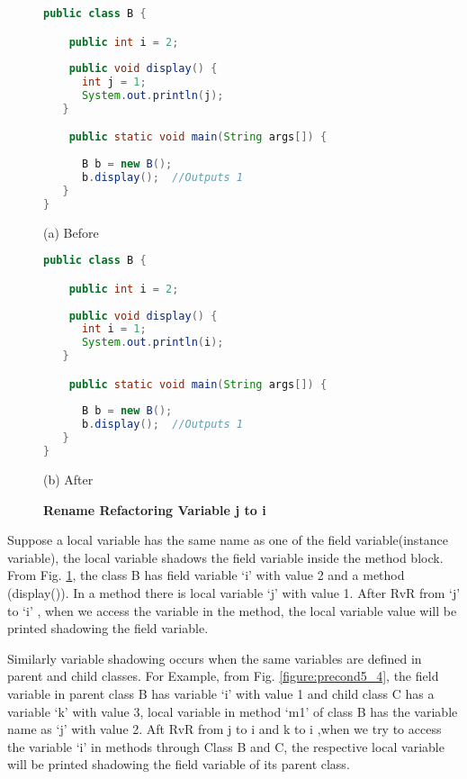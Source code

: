 \begin{figure}[th]
\centering
\begin{minipage}[t]{0.8\linewidth}
\begin{lstlisting}[language=java, basicstyle=\scriptsize\ttfamily,frame=single]
public class B {

    public int i = 2;
    
    public void display() {
      int j = 1;
      System.out.println(j); 		
   }

    public static void main(String args[]) {
    
      B b = new B();
      b.display();  //Outputs 1
   }
}
\end{lstlisting}
\centering(a) Before 
\end{minipage}
\hfill
\begin{minipage}[t]{0.8\linewidth}
\begin{lstlisting}[language=java, basicstyle=\scriptsize\ttfamily,frame=single]
public class B {

    public int i = 2;
    
    public void display() {
      int i = 1;
      System.out.println(i); 		
   }

    public static void main(String args[]) {
    
      B b = new B();
      b.display();  //Outputs 1
   }
}
\end{lstlisting}
\centering(b) After 
\end{minipage}
\caption{\textbf{Rename Refactoring Variable j to i }}
\label{figure:precond5_3}
\end{figure}


Suppose a local variable has the same name as one of the field variable(instance variable), the local variable shadows the field variable inside the method block. From Fig. \ref{figure:precond5_3}, the class B has field variable `i' with value 2 and a method (display()). In a method there is local variable `j' with value 1. After RvR from `j' to `i' , when we access the variable in the method, the local variable value will be printed shadowing the field variable.

Similarly variable shadowing occurs when the same variables are defined in parent and child classes.
For Example, from Fig. \ref{figure:precond5_4}, the field variable  in parent class B has variable `i' with value 1 and child class C has a variable `k' with value 3, local variable in method `m1' of class B has the  variable name as `j' with value 2.  Aft RvR from j to i and k to i ,when we try to access the variable `i' in methods through Class B and C, the respective local variable will be printed shadowing the field variable of its parent class.


